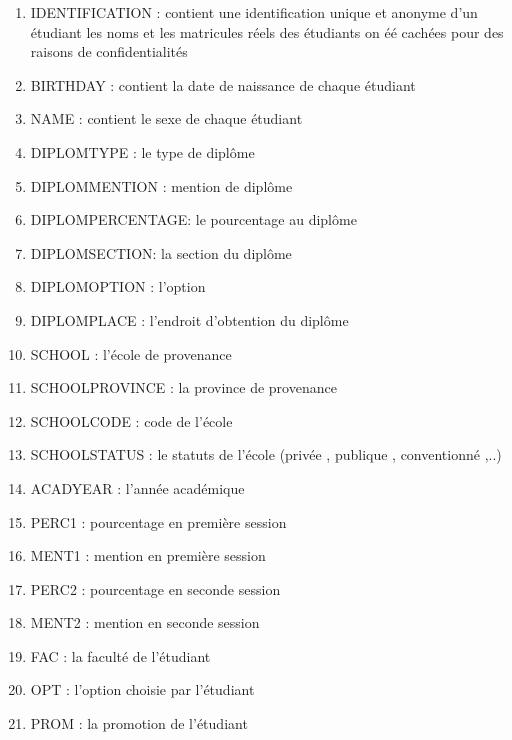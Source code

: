 \begin{multicols}{2}
	\begin{enumerate}
	 \item IDENTIFICATION : contient une identification unique et anonyme d'un étudiant les noms et les matricules réels des étudiants on éé cachées
	pour des raisons de confidentialités
	
	\item BIRTHDAY : contient la date de naissance de chaque étudiant
	
	\item NAME : contient le sexe de chaque étudiant
	

	
	\item DIPLOMTYPE : le type de diplôme
	
	\item DIPLOMMENTION : mention de diplôme
	
	\item  DIPLOMPERCENTAGE: le pourcentage au diplôme
	
	\item DIPLOMSECTION: la section du diplôme
	
	\item DIPLOMOPTION : l'option
	
	\item  DIPLOMPLACE : l'endroit d'obtention du diplôme
	
	\item SCHOOL : l'école de provenance
	
	\item  SCHOOLPROVINCE : la province de provenance
	
	\item  SCHOOLCODE : code de l'école
	
	\item SCHOOLSTATUS : le statuts de l'école (privée , publique ,
	conventionné ,..)
	
	\item  ACADYEAR : l'année académique
	
	\item  PERC1 : pourcentage en première session
	
	\item  MENT1 : mention en première session
	
	\item  PERC2 : pourcentage en seconde session
	
	\item  MENT2 : mention en seconde session
	
	\item  FAC : la faculté de l'étudiant 
	
	\item  OPT : l'option choisie par l'étudiant
	
	\item  PROM : la promotion de l'étudiant 
	\end{enumerate}
\end{multicols}

